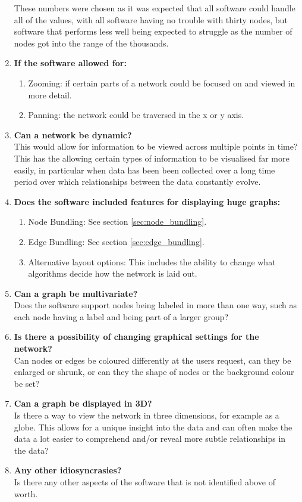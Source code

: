 \documentclass[../dissertation.tex]{subfiles}
\begin{document}
\begin{enumerate}
	These numbers were chosen as it was expected that all software could handle all of the values, with all software having no trouble with thirty nodes, but software that performs less well being expected to struggle as the number of nodes got into the range of the thousands. 
	\item \textbf{If the software allowed for:}
	\begin{enumerate}
		\item Zooming: if certain parts of a network could be focused on and viewed in more detail.
		\item Panning: the network could be traversed in the x or y axis.
	\end{enumerate}
	\item \textbf{Can a network be dynamic?}\\
	This would allow for information to be viewed across multiple points in time? This has the allowing certain types of information to be visualised far more easily, in particular when data has been been collected over a long time period over which relationships between the data constantly evolve.
	\item \textbf{Does the software included features for displaying huge graphs:}
	\begin{enumerate} 
		\item Node Bundling: See section \ref{sec:node_bundling}.
		\item Edge Bundling: See section \ref{sec:edge_bundling}.
		\item Alternative layout options: This includes the ability to change what algorithms decide how the network is laid out.
	\end{enumerate}
	\item \textbf{Can a graph be multivariate?}\\
	Does the software support nodes being labeled in more than one way, such as each node having a label and being part of a larger group?
	\item \textbf{Is there a possibility of changing graphical settings for the network?}\\
	Can nodes or edges be coloured differently at the users request, can they be enlarged or shrunk, or can they the shape of nodes or the background colour be set?
	\item \textbf{Can a graph be displayed in 3D?}\\
	Is there a way to view the network in three dimensions, for example as a globe. This allows for a unique insight into the data and can often make the data a lot easier to comprehend and/or reveal more subtle relationships in the data?
	\item \textbf{Any other idiosyncrasies?}\\
	Is there any other aspects of the software that is not identified above of worth.
\end{enumerate}
\end{document}
